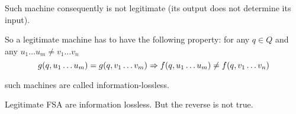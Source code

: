 Such machine consequently is not legitimate (its output does not determine its input).

\begin{corollary}
    So a legitimate machine has to have the following property: for any $q\in Q$ and any $u_1\ldots u_m \neq v_1\ldots v_n$
    \[
            g(q,u_1\ldots u_m) = g(q,v_1\ldots v_m) \Rightarrow f(q,u_1\ldots u_m) \neq f(q,v_1\ldots v_n)
    \]
\end{corollary}
such machines are called information-lossless.

Legitimate FSA are information lossless. But the reverse is not true.